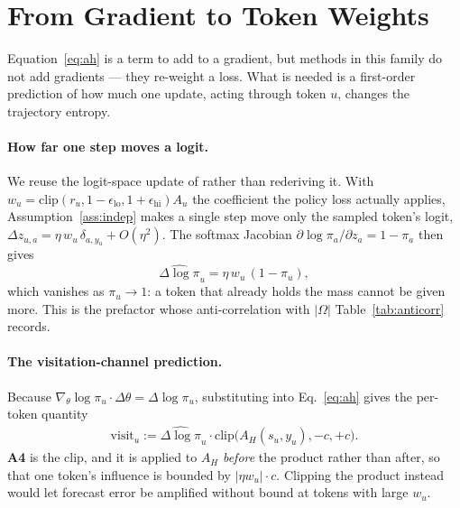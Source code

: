 \documentclass[11pt]{article}
\newcommand{\AH}{A_{H}}
\newcommand{\Om}{\Omega}
\newcommand{\gradt}{\nabla_{\theta}}
\begin{document}
\section{From Gradient to Token Weights}
\label{sec:weights}

Equation~\eqref{eq:ah} is a term to add to a gradient, but methods in this family do
not add gradients --- they re-weight a loss. What is needed is a first-order
prediction of how much one update, acting through token $u$, changes the trajectory
entropy.

\paragraph{How far one step moves a logit.}
We reuse the logit-space update of \citet[Eq.~23]{steer} rather than rederiving it.
With $w_u = \mathrm{clip}(r_u, 1-\epsilon_{\mathrm{lo}}, 1+\epsilon_{\mathrm{hi}})A_u$
the coefficient the policy loss actually applies, Assumption~\ref{ass:indep} makes a
single step move only the sampled token's logit,
$\Delta z_{u,a} = \eta\, w_u\, \delta_{a, y_u} + O(\eta^2)$.
The softmax Jacobian $\partial \log \pi_a / \partial z_a = 1 - \pi_a$ then gives
%
\begin{equation}
\widehat{\Delta \log \pi}_u = \eta\, w_u\,(1 - \pi_u),
\label{eq:dlogpi}
\end{equation}
%
which vanishes as $\pi_u \to 1$: a token that already holds the mass cannot be given
more. This is the prefactor whose anti-correlation with $|\Om|$ Table~\ref{tab:anticorr}
records.

\paragraph{The visitation-channel prediction.}
Because $\gradt \log \pi_u \cdot \Delta\theta = \Delta \log \pi_u$, substituting into
Eq.~\eqref{eq:ah} gives the per-token quantity
%
\begin{equation}
\begin{split}
\mathrm{visit}_u := \widehat{\Delta \log \pi}_u \cdot
\mathrm{clip}\bigl(\AH(s_u,y_u), -c, +c\bigr).
\end{split}
\label{eq:visit}
\end{equation}
%
\textbf{A4} is the clip, and it is applied to $\AH$ \emph{before} the product rather
than after, so that one token's influence is bounded by $|\eta w_u| \cdot c$.
Clipping the product instead would let forecast error be amplified without bound at
tokens with large $w_u$.
\end{document}
